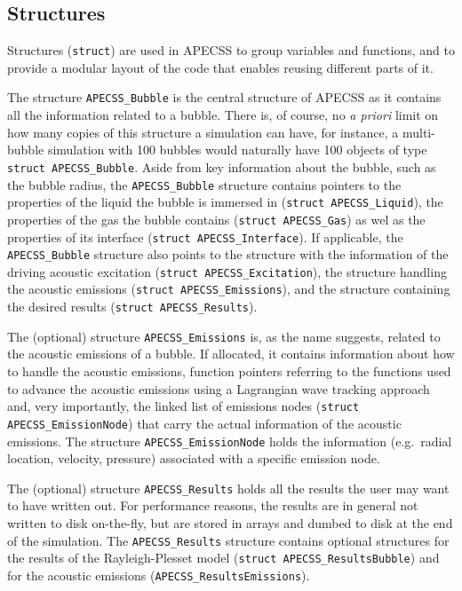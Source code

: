 \subsection{Structures}

Structures ({\tt struct}) are used in APECSS to group variables and functions, and to provide a modular layout of the code that enables reusing different parts of it.

The structure {\tt APECSS\_Bubble} is the central structure of APECSS as it contains all the information related to a bubble. There is, of course, no {\it a priori} limit on how many copies of this structure a simulation can have, for instance, a multi-bubble simulation with 100 bubbles would naturally have 100 objects of type {\tt struct APECSS\_Bubble}. Aside from key information about the bubble, such as the bubble radius, the {\tt APECSS\_Bubble} structure contains pointers to the properties of the liquid the bubble is immersed in ({\tt struct APECSS\_Liquid}), the properties of the gas the bubble contains ({\tt struct APECSS\_Gas}) as wel as the properties of its interface ({\tt struct APECSS\_Interface}). If applicable, the {\tt APECSS\_Bubble} structure also points to the structure with the information of the driving acoustic excitation ({\tt struct APECSS\_Excitation}), the structure handling the acoustic emissions ({\tt struct APECSS\_Emissions}), and the structure containing the desired results ({\tt struct APECSS\_Results}). 

The (optional) structure {\tt APECSS\_Emissions} is, as the name suggests, related to the acoustic emissions of a bubble. If allocated, it contains information about how to handle the acoustic emissions, function pointers referring to the functions used to advance the acoustic emissions using a Lagrangian wave tracking approach and, very importantly, the linked list of emissions nodes ({\tt struct APECSS\_EmissionNode}) that carry the actual information of the acoustic emissions. The structure {\tt APECSS\_EmissionNode}  holds the information (e.g.~radial location, velocity, pressure) associated with a specific emission node.

The (optional) structure {\tt APECSS\_Results} holds all the results the user may want to have written out. For performance reasons, the results are in general not written to disk on-the-fly, but are stored in arrays and dumbed to disk at the end of the simulation. The {\tt APECSS\_Results} structure contains optional structures for the results of the Rayleigh-Plesset model ({\tt struct APECSS\_ResultsBubble}) and for the acoustic emissions ({\tt APECSS\_ResultsEmissions}).

